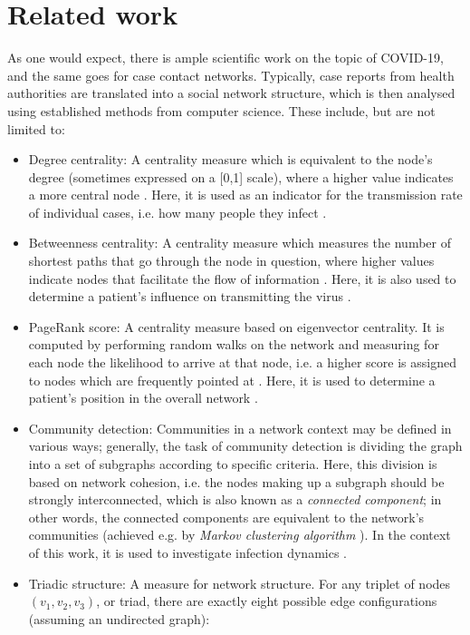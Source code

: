 \documentclass{article}
\begin{document}
	\section{Related work}
	\label{sec:Related_work}
	As one would expect, there is ample scientific work on the topic of COVID-19, and the same goes for case contact networks. Typically, case reports from health authorities are translated into a social network structure, which is then analysed using established methods from computer science. These include, but are not limited to:
	\begin{itemize}
		\item Degree centrality: A centrality measure which is equivalent to the node's degree (sometimes expressed on a [0,1] scale), where a higher value indicates a more central node \cite{golbeck}. Here, it is used as an indicator for the transmission rate of individual cases, i.e. how many people they infect \cite{hainan_publication,shanxi_publication}.
		\item Betweenness centrality: A centrality measure which measures the number of shortest paths that go through the node in question, where higher values indicate nodes that facilitate the flow of information \cite{golbeck}. Here, it is also used to determine a patient's influence on transmitting the virus \cite{hainan_publication}.
		\item PageRank score: A centrality measure based on eigenvector centrality. It is computed by performing random walks on the network and measuring for each node the likelihood to arrive at that node, i.e. a higher score is assigned to nodes which are frequently pointed at \cite{gleich_pagerank}. Here, it is used to determine a patient's position in the overall network \cite{hainan_publication,shanxi_publication}.
		\item Community detection: Communities in a network context may be defined in various ways; generally, the task of community detection is dividing the graph into a set of subgraphs according to specific criteria. Here, this division is based on network cohesion, i.e. the nodes making up a subgraph should be strongly interconnected, which is also known as a \emph{connected component}; in other words, the connected components are equivalent to the network's communities (achieved e.g. by \emph{Markov clustering algorithm} \cite{community_detection,markov_clustering}). In the context of this work, it is used to investigate infection dynamics \cite{hainan_publication}.
		\item Triadic structure: A measure for network structure. For any triplet of nodes $(v_1,v_2,v_3)$, or triad, there are exactly eight possible edge configurations (assuming an undirected graph): 

\end{itemize}
\end{document}
